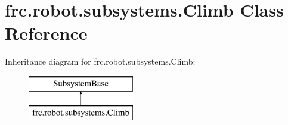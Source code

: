 \hypertarget{classfrc_1_1robot_1_1subsystems_1_1_climb}{}\section{frc.\+robot.\+subsystems.\+Climb Class Reference}
\label{classfrc_1_1robot_1_1subsystems_1_1_climb}
Inheritance diagram for frc.\+robot.\+subsystems.\+Climb\+:\begin{figure}[H]
\begin{center}
\leavevmode
\includegraphics[height=2.000000cm]{classfrc_1_1robot_1_1subsystems_1_1_climb}
\end{center}
\end{figure}
